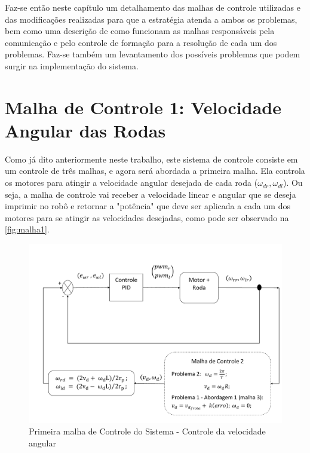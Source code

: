 Faz-se então neste capítulo um detalhamento das malhas de controle utilizadas e das modificações realizadas para que a estratégia atenda a ambos os problemas, bem como uma descrição de como funcionam as malhas responsáveis pela comunicação e pelo controle de formação para a resolução de cada um dos problemas. Faz-se também um levantamento dos possíveis problemas que podem surgir na implementação do sistema.   

\section{Malha de Controle 1: Velocidade Angular das Rodas}
\label{sec:malha1 } 
Como já dito anteriormente neste trabalho, este sistema de controle consiste em um controle de três malhas, e agora será abordada a primeira malha. Ela controla os motores para atingir a velocidade angular desejada de cada roda ($\omega_{dr},\omega_{dl}$). Ou seja, a malha de controle vai receber a velocidade linear e angular que se deseja imprimir no robô e retornar a "potência" que deve ser aplicada a cada um dos motores para se atingir as velocidades desejadas, como pode ser observado na \autoref{fig:malha1}.

\begin{figure}[!htb]
	\centering
	\includegraphics[width=1.0\textwidth]{./04-figuras/malha1}
	\caption{Primeira malha de Controle do Sistema - Controle da velocidade angular}
	\label{fig:malha1}
\end{figure}

